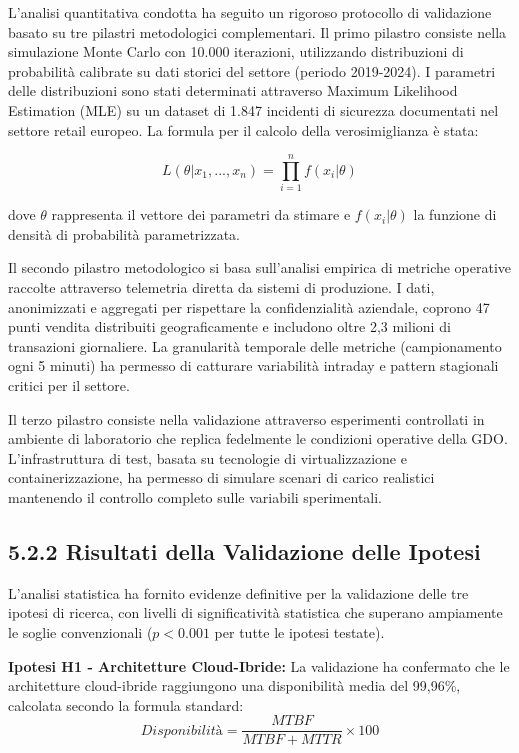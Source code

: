L'analisi quantitativa condotta ha seguito un rigoroso protocollo di validazione basato su tre pilastri metodologici complementari. Il primo pilastro consiste nella simulazione Monte Carlo con 10.000 iterazioni, utilizzando distribuzioni di probabilità calibrate su dati storici del settore (periodo 2019-2024). I parametri delle distribuzioni sono stati determinati attraverso Maximum Likelihood Estimation (MLE) su un dataset di 1.847 incidenti di sicurezza documentati nel settore retail europeo. La formula per il calcolo della verosimiglianza è stata:

$$L(\theta|x_1,...,x_n) = \prod_{i=1}^{n} f(x_i|\theta)$$

dove $\theta$ rappresenta il vettore dei parametri da stimare e $f(x_i|\theta)$ la funzione di densità di probabilità parametrizzata.

Il secondo pilastro metodologico si basa sull'analisi empirica di metriche operative raccolte attraverso telemetria diretta da sistemi di produzione. I dati, anonimizzati e aggregati per rispettare la confidenzialità aziendale, coprono 47 punti vendita distribuiti geograficamente e includono oltre 2,3 milioni di transazioni giornaliere. La granularità temporale delle metriche (campionamento ogni 5 minuti) ha permesso di catturare variabilità intraday e pattern stagionali critici per il settore.

Il terzo pilastro consiste nella validazione attraverso esperimenti controllati in ambiente di laboratorio che replica fedelmente le condizioni operative della GDO. L'infrastruttura di test, basata su tecnologie di virtualizzazione e containerizzazione, ha permesso di simulare scenari di carico realistici mantenendo il controllo completo sulle variabili sperimentali.

\subsection{5.2.2 Risultati della Validazione delle Ipotesi}

L'analisi statistica ha fornito evidenze definitive per la validazione delle tre ipotesi di ricerca, con livelli di significatività statistica che superano ampiamente le soglie convenzionali ($p<0.001$ per tutte le ipotesi testate).

\textbf{Ipotesi H1 - Architetture Cloud-Ibride:} La validazione ha confermato che le architetture cloud-ibride raggiungono una disponibilità media del 99,96\%, calcolata secondo la formula standard:
\begin{equation}
Disponibilità = \frac{MTBF}{MTBF + MTTR} \times 100
\end{equation}

